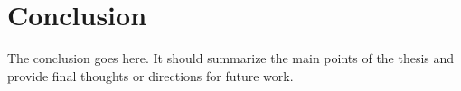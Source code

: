 \section{Conclusion}

The conclusion goes here. It should summarize the main points of the thesis and provide final thoughts or directions for future work.
